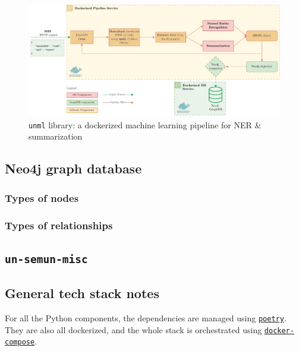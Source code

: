 \documentclass[11pt]{article}
\begin{document}
\begin{figure}[!htb]
    \centering

    \includegraphics[width=\textwidth]{res/ml-pipeline.pdf}
    \caption{\texttt{unml} library: a dockerized machine learning pipeline for NER \& summarization}

    \label{fig:ml-pipeline}
\end{figure}



\subsection{Neo4j graph database} \label{ssec:neo4j-graph-database}

\subsubsection{Types of nodes} \label{sssec:types-of-nodes}

\subsubsection{Types of relationships} \label{sssec:types-of-relationships}


\subsection{\texttt{un-semun-misc}} \label{ssec:un-semun-misc}




\subsection{General tech stack notes} \label{ssec:general-tech-stack-notes}

For all the Python components, the dependencies are managed using \href{https://github.com/python-poetry/poetry}{\texttt{poetry}}. They are also all dockerized, and the whole stack is orchestrated using \href{https://docs.docker.com/compose/}{\texttt{docker-compose}}.
\end{document}
